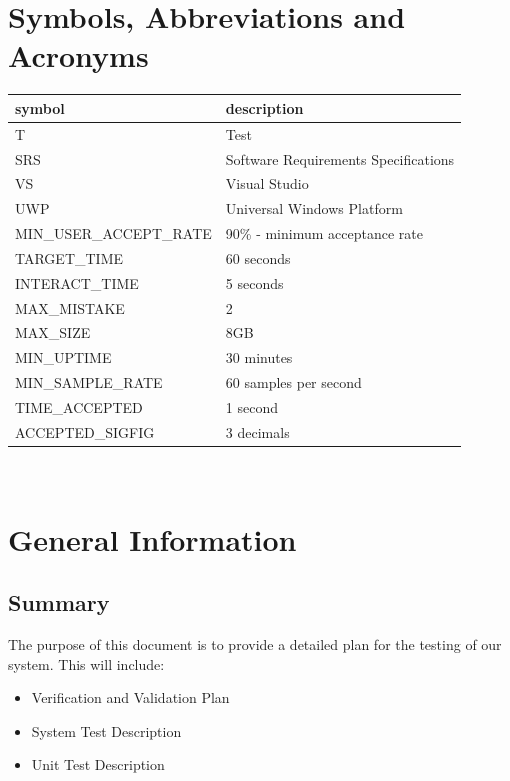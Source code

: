 \documentclass[12pt, titlepage]{article}
\begin{document}
\section{Symbols, Abbreviations and Acronyms}

\renewcommand{\arraystretch}{1.2}
\begin{tabular}{l l} 
  \toprule		
  \textbf{symbol} & \textbf{description}\\
  \midrule 
  T & Test\\
  SRS & Software Requirements Specifications \\
  VS & Visual Studio\\
  UWP & Universal Windows Platform\\
  MIN\_USER\_ACCEPT\_RATE & 90\% - minimum acceptance rate\\
  TARGET\_TIME & 60 seconds \\
  INTERACT\_TIME & 5 seconds \\
  MAX\_MISTAKE & 2 \\
  MAX\_SIZE & 8GB \\ 
  MIN\_UPTIME & 30 minutes \\ 
  MIN\_SAMPLE\_RATE & 60 samples per second\\
  TIME\_ACCEPTED & 1 second \\
  ACCEPTED\_SIGFIG & 3 decimals \\
  \bottomrule
\end{tabular}\\


\newpage


\section{General Information}

\subsection{Summary}

The purpose of this document is to provide a detailed plan for the testing of our system. This will include:
\begin{itemize}
  \item Verification and Validation Plan
  \item System Test Description
  \item Unit Test Description
\end{itemize}
\end{document}
